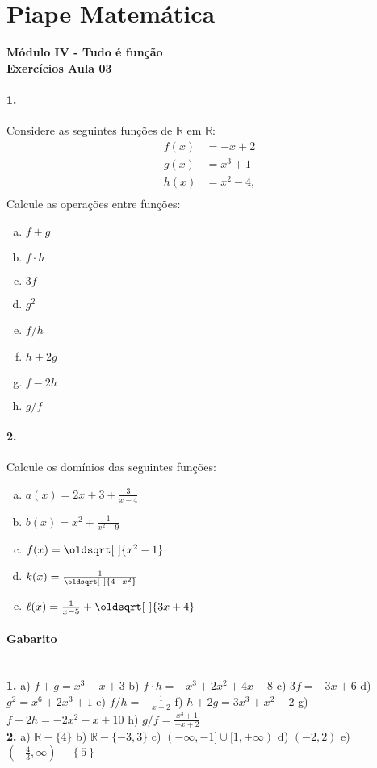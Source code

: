 \documentclass[a4paper,12pt]{article}
\renewcommand*{\sqrt}[2][\ ]{\oldsqrt[#1]{#2}}
\begin{document}
 
  
\section*{Piape Matemática} 
\textbf{Módulo IV - Tudo é função}\\
\textbf{Exercícios Aula 03}    

\begin{multicols}{2}
\paragraph*{1.} Considere as seguintes funções de $\mathbb{R}$ em $\mathbb{R}$:
\begin{align*}
f(x) &= -x + 2\\
g(x) &= x^3 + 1\\
h(x) &= x^2 - 4,\\
\end{align*} 
Calcule as operações entre funções:
\begin{enumerate}[a)] 
    \item $f + g$
    \item $f \cdot h$
    \item $3f$
    \item $g^2$
    \item $f/h$
    \item $h + 2g$
    \item $f- 2h$
    \item $g/f$
\end{enumerate}

\paragraph*{2.} Calcule os domínios das seguintes funções:
\begin{enumerate}[a)]
    \item $a(x) = 2x + 3 + \frac{3}{x-4}$
    \item $b(x) = x^2 + \frac{1}{x^2 - 9}$
    \item $f(x) = \sqrt{x^2 - 1}$ 
    \item $k(x) = \frac{1}{\sqrt{4 - x^2 }}$
    \item $\ell(x) = \frac{1}{x - 5} + \sqrt{3x + 4}$
\end{enumerate}

\vspace*{5cm}
\end{multicols}

\vspace*{\fill}
{\footnotesize
\paragraph*{Gabarito} \hspace*{\fill}\\
\textbf{1.}  a) $f + g = x^3 - x + 3$
 b) $f \cdot h = -x^3  + 2x^2 + 4x - 8$ 
 c) $3f = -3x + 6$ 
 d) $g^2 = x^6 + 2x^3 + 1$ 
 e) $f/h = -\frac{1}{x + 2}$ 
 f) $h + 2g = 3x^3 + x^2 - 2$ 
 g) $f - 2h = -2x^2 -x+ 10$ 
 h) $g/f = \frac{x^3 + 1}{-x + 2}$\\
\textbf{2.} a) $\mathbb{R} - \{4\}$ 
 b) $\mathbb{R} - \{-3, 3\}$ 
 c) $(-\infty, -1]\cup[1,+\infty)$ 
 d) $(-2, 2)$ 
 e) $\left(-\frac{4}{3},\infty\right) - \left\{ 5 \right\}$ 
}
\end{document}
